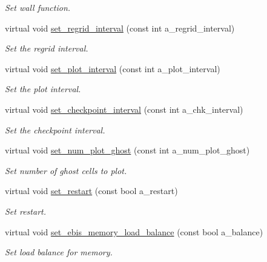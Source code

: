 \begin{DoxyCompactItemize}
\begin{DoxyCompactList}\small\item\em Set wall function. \end{DoxyCompactList}\item 
virtual void \hyperlink{classplasma__engine_a17b810c41e8a630199bcd0ff22969dde}{set\+\_\+regrid\+\_\+interval} (const int a\+\_\+regrid\+\_\+interval)
\begin{DoxyCompactList}\small\item\em Set the regrid interval. \end{DoxyCompactList}\item 
virtual void \hyperlink{classplasma__engine_ac908f64ffb2e8adb84a1415d7dfa82d0}{set\+\_\+plot\+\_\+interval} (const int a\+\_\+plot\+\_\+interval)
\begin{DoxyCompactList}\small\item\em Set the plot interval. \end{DoxyCompactList}\item 
virtual void \hyperlink{classplasma__engine_a5e2ee7a101954dee592129a3915739fd}{set\+\_\+checkpoint\+\_\+interval} (const int a\+\_\+chk\+\_\+interval)
\begin{DoxyCompactList}\small\item\em Set the checkpoint interval. \end{DoxyCompactList}\item 
virtual void \hyperlink{classplasma__engine_ae0f51b5046c218eb0805fcee939422fb}{set\+\_\+num\+\_\+plot\+\_\+ghost} (const int a\+\_\+num\+\_\+plot\+\_\+ghost)
\begin{DoxyCompactList}\small\item\em Set number of ghost cells to plot. \end{DoxyCompactList}\item 
virtual void \hyperlink{classplasma__engine_aaadc8e4842483fe19dc9261e974aeb72}{set\+\_\+restart} (const bool a\+\_\+restart)
\begin{DoxyCompactList}\small\item\em Set restart. \end{DoxyCompactList}\item 
virtual void \hyperlink{classplasma__engine_a13b2847b614b558dc0362076343c3dcf}{set\+\_\+ebis\+\_\+memory\+\_\+load\+\_\+balance} (const bool a\+\_\+balance)
\begin{DoxyCompactList}\small\item\em Set load balance for memory. \end{DoxyCompactList}\item 

\end{DoxyCompactItemize}
